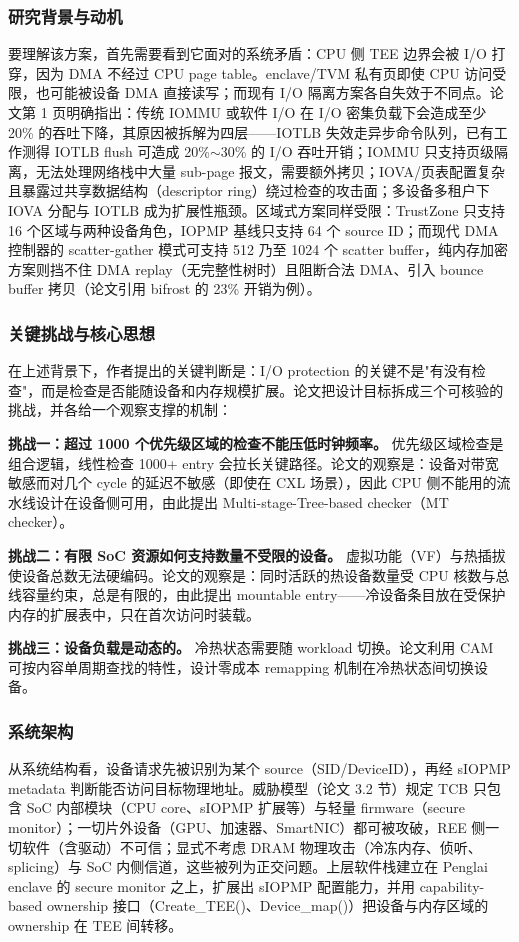\documentclass[11pt]{ctexart}
\begin{document}
\subsubsection{研究背景与动机}
要理解该方案，首先需要看到它面对的系统矛盾：CPU 侧 TEE 边界会被 I/O 打穿，因为 DMA 不经过 CPU page table。enclave/TVM 私有页即使 CPU 访问受限，也可能被设备 DMA 直接读写；而现有 I/O 隔离方案各自失效于不同点。论文第 1 页明确指出：传统 IOMMU 或软件 I/O 在 I/O 密集负载下会造成至少 20\% 的吞吐下降，其原因被拆解为四层——IOTLB 失效走异步命令队列，已有工作测得 IOTLB flush 可造成 20\%$\sim$30\% 的 I/O 吞吐开销；IOMMU 只支持页级隔离，无法处理网络栈中大量 sub-page 报文，需要额外拷贝；IOVA/页表配置复杂且暴露过共享数据结构（descriptor ring）绕过检查的攻击面；多设备多租户下 IOVA 分配与 IOTLB 成为扩展性瓶颈。区域式方案同样受限：TrustZone 只支持 16 个区域与两种设备角色，IOPMP 基线只支持 64 个 source ID；而现代 DMA 控制器的 scatter-gather 模式可支持 512 乃至 1024 个 scatter buffer，纯内存加密方案则挡不住 DMA replay（无完整性树时）且阻断合法 DMA、引入 bounce buffer 拷贝（论文引用 bifrost 的 23\% 开销为例）。\par
\subsubsection{关键挑战与核心思想}
在上述背景下，作者提出的关键判断是：I/O protection 的关键不是"有没有检查"，而是检查是否能随设备和内存规模扩展。论文把设计目标拆成三个可核验的挑战，并各给一个观察支撑的机制：\par
\noindent\textbf{挑战一：超过 1000 个优先级区域的检查不能压低时钟频率。} 优先级区域检查是组合逻辑，线性检查 1000+ entry 会拉长关键路径。论文的观察是：设备对带宽敏感而对几个 cycle 的延迟不敏感（即使在 CXL 场景），因此 CPU 侧不能用的流水线设计在设备侧可用，由此提出 Multi-stage-Tree-based checker（MT checker）。\par
\noindent\textbf{挑战二：有限 SoC 资源如何支持数量不受限的设备。} 虚拟功能（VF）与热插拔使设备总数无法硬编码。论文的观察是：同时活跃的热设备数量受 CPU 核数与总线容量约束，总是有限的，由此提出 mountable entry——冷设备条目放在受保护内存的扩展表中，只在首次访问时装载。\par
\noindent\textbf{挑战三：设备负载是动态的。} 冷热状态需要随 workload 切换。论文利用 CAM 可按内容单周期查找的特性，设计零成本 remapping 机制在冷热状态间切换设备。\par
\subsubsection{系统架构}
从系统结构看，设备请求先被识别为某个 source（SID/DeviceID），再经 sIOPMP metadata 判断能否访问目标物理地址。威胁模型（论文 3.2 节）规定 TCB 只包含 SoC 内部模块（CPU core、sIOPMP 扩展等）与轻量 firmware（secure monitor）；一切片外设备（GPU、加速器、SmartNIC）都可被攻破，REE 侧一切软件（含驱动）不可信；显式不考虑 DRAM 物理攻击（冷冻内存、侦听、splicing）与 SoC 内侧信道，这些被列为正交问题。上层软件栈建立在 Penglai enclave 的 secure monitor 之上，扩展出 sIOPMP 配置能力，并用 capability-based ownership 接口（Create\_TEE()、Device\_map()）把设备与内存区域的 ownership 在 TEE 间转移。\par
\end{document}
